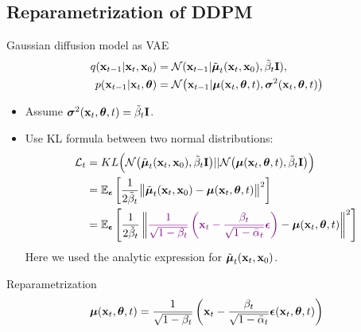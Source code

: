 \subsection{Reparametrization of DDPM}
\begin{frame}{Gaussian diffusion model as VAE}
	\vspace{-0.5cm}
	\begin{align*}
		q(\mathbf{x}_{t-1} | \mathbf{x}_t, \mathbf{x}_0) &= \mathcal{N}(\mathbf{x}_{t-1} | \tilde{\boldsymbol{\mu}}_t(\mathbf{x}_t, \mathbf{x}_0), \tilde{\beta}_t \mathbf{I}), \\
		p(\mathbf{x}_{t - 1} | \mathbf{x}_t, \boldsymbol{\theta}) &= \mathcal{N} \bigl(\mathbf{x}_{t - 1} | \boldsymbol{\mu}(\mathbf{x}_t, \boldsymbol{\theta}, t), \boldsymbol{\sigma}^2(\mathbf{x}_t, \boldsymbol{\theta}, t)\bigr)
	\end{align*}
	\vspace{-0.5cm}
	\begin{itemize}
		\item Assume $\boldsymbol{\sigma}^2(\mathbf{x}_t, \boldsymbol{\theta}, t) = \tilde{\beta}_t \mathbf{I}$.
		\item Use KL formula between two normal distributions:
		\begin{align*}
			\mathcal{L}_t &= KL\Bigl(\mathcal{N}\bigl(\tilde{\boldsymbol{\mu}}_t(\mathbf{x}_t, \mathbf{x}_0), \tilde{\beta}_t \mathbf{I} \bigr) || \mathcal{N}\bigl(\boldsymbol{\mu}(\mathbf{x}_t, \boldsymbol{\theta}, t), \tilde{\beta}_t \mathbf{I}\bigr)\Bigr) \\ 
			&= \mathbb{E}_{\boldsymbol{\epsilon}} \left[ \frac{1}{2\tilde{\beta}_t} \bigl\| \tilde{\boldsymbol{\mu}}_t(\mathbf{x}_t, \mathbf{x}_0) - \boldsymbol{\mu}(\mathbf{x}_t, \boldsymbol{\theta}, t) \bigr\|^2 \right] \\
			& = \mathbb{E}_{\boldsymbol{\epsilon}} \left[ \frac{1}{2\tilde{\beta}_t} \left\| {\color{violet} \frac{1}{\sqrt{1 - \beta_t}}\left( \mathbf{x}_t - \frac{\beta_t}{\sqrt{1 - \bar{\alpha}_t} } \boldsymbol{\epsilon} \right)} - \boldsymbol{\mu}(\mathbf{x}_t, \boldsymbol{\theta}, t) \right\|^2 \right]
		\end{align*}
		 {\color{gray}Here we used the analytic expression for $\tilde{\boldsymbol{\mu}}_t(\mathbf{x}_t, \mathbf{x}_0)$.}
	\end{itemize}
	\begin{block}{Reparametrization}
		\vspace{-0.3cm}
		\[
			\boldsymbol{\mu}(\mathbf{x}_t, \boldsymbol{\theta}, t) = \frac{1}{\sqrt{1 - \beta_t}}\left( \mathbf{x}_t - \frac{\beta_t}{\sqrt{1 - \bar{\alpha}_t} } \boldsymbol{\epsilon}(\mathbf{x}_t, \boldsymbol{\theta}, t) \right) 
		\]
		\vspace{-0.6cm}
	\end{block}
	\end{frame}

